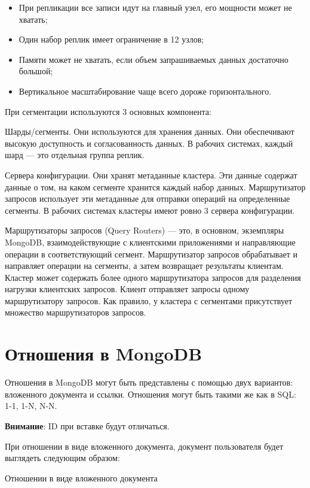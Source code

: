 \begin{itemize}
	\item При репликации все записи идут на главный узел, его мощности
		может не хватать;
	\item Один набор реплик имеет ограничение в 12 узлов;
	\item Памяти может не хватать, если объем запрашиваемых данных
		достаточно большой;
	\item Вертикальное масштабирование чаще всего дороже горизонтального.
\end{itemize}

При сегментации используются 3 основных компонента:\par
Шарды/сегменты. Они используются для хранения данных. Они
обеспечивают высокую доступность и согласованность данных. В рабочих
системах, каждый шард --- это отдельная группа реплик.\par
Сервера конфигурации. Они хранят метаданные кластера. Эти данные
содержат данные о том, на каком сегменте хранится каждый набор данных.
Маршрутизатор запросов использует эти метаданные для отправки операций на
определенные сегменты. В рабочих системах кластеры имеют ровно 3 сервера
конфигурации.\par
Маршрутизаторы запросов (Query Routers) --- это, в основном,
экземпляры MongoDB, взаимодействующие с клиентскими приложениями и
направляющие операции в соответствующий сегмент. Маршрутизатор запросов
обрабатывает и направляет операции на сегменты, а затем возвращает
результаты клиентам. Кластер может содержать более одного маршрутизатора
запросов для разделения нагрузки клиентских запросов. Клиент отправляет
запросы одному маршрутизатору запросов. Как правило, у кластера с
сегментами присутствует множество маршрутизаторов запросов.

\section{Отношения в MongoDB}

Отношения в MongoDB могут быть представлены с помощью двух
вариантов: вложенного документа и ссылки. Отношения могут быть такими же
как в SQL: 1-1, 1-N, N-N.\par
\textbf{Внимание}: ID при вставке будут отличаться.\par
При отношении в виде вложенного документа, документ пользователя
будет выглядеть следующим образом:

\begin{image}
	\caption{Отношении в виде вложенного документа}
	\label{fig:relationship}
\end{image}

